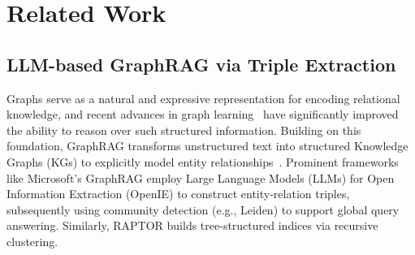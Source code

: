 \begin{table}[t]
    \centering
    \small
    \caption{Detailed hyperparameter settings for \EHGRAG across four benchmark datasets.}
    \label{tab:hyperparams}
\end{table}
\section{Related Work}
\label{related-work}
\subsection{LLM-based GraphRAG via Triple Extraction}
Graphs serve as a natural and expressive representation for encoding relational knowledge, and recent advances in graph learning~\cite{song2021dynamic,song2024efficient,song2025ddfi,chendecoupled,luo2024fast,chen2023lsgnn} have significantly improved the ability to reason over such structured information. Building on this foundation, GraphRAG transforms unstructured text into structured Knowledge Graphs (KGs) to explicitly model entity relationships~\citep{zhang2025erarag,zhou2025depth,xiao2025graphragbenchchallengingdomainspecificreasoning,zhang2025survey,xiang2025use,mavromatis2024gnn}. Prominent frameworks like Microsoft's GraphRAG \cite{edge2024local} employ Large Language Models (LLMs) for Open Information Extraction (OpenIE) to construct entity-relation triples, subsequently using community detection (e.g., Leiden) to support global query answering. Similarly, RAPTOR \cite{sarthi2024raptor} builds tree-structured indices via recursive clustering.

